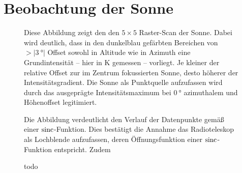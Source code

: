 \section{Beobachtung der Sonne}
\begin{figure}[H]
    \centering
    
    \caption[Raster-Scan der Sonne]{Diese Abbildung zeigt den den $5 \times 5$ Raster-Scan der Sonne. Dabei wird deutlich, dass in den dunkelblau gefärbten Bereichen von $>\vert \SI{3}{\degree}\vert$ Offset sowohl in Altitude wie in Azimuth eine Grundintensität -- hier in \si{\kelvin} gemessen -- vorliegt. Je kleiner der relative Offset zur im Zentrum fokussierten Sonne, desto höherer der Intensitätsgradient. Die Sonne als Punktquelle aufzufassen wird durch das ausgeprägte Intensitätsmaximum bei $\SI{0}{\degree}$ azimuthalem und Höhenoffset legitimiert.}
    \label{fig:Sonnenabbild}
\end{figure}

\begin{figure}[H]
    \centering
    
    \caption[Kreuz-Scan der Sonne, Azimuthaler Offset]{Die Abbildung verdeutlicht den Verlauf der Datenpunkte gemäß einer $\operatorname{sinc}$-Funktion. Dies bestätigt die Annahme das Radioteleskop als Lochblende aufzufassen, deren Öffnungsfunktion einer $\operatorname{sinc}$-Funktion entspricht. Zudem }
    \label{fig:Sonnenkreuz_Az}
\end{figure}

\begin{figure}[H]
    \centering
    
    \caption[Kreuz-Scan der Sonne, Altitude Offset]{todo}
    \label{fig:Sonnenkreuz_Alt}
\end{figure}